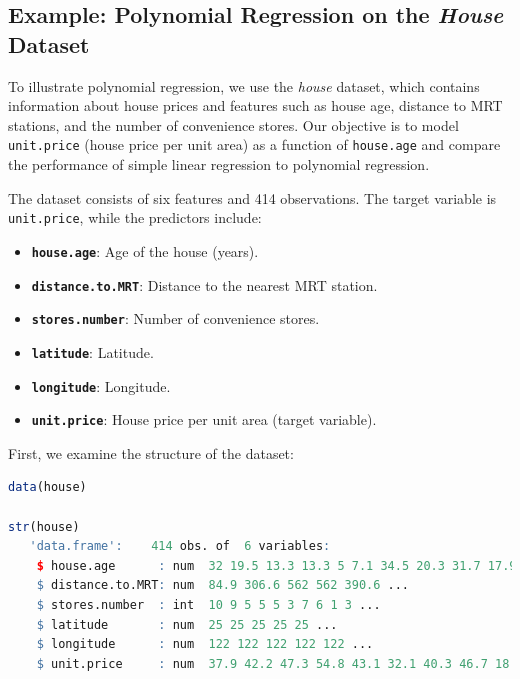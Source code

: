 \documentclass[
]{book}
\newcommand{\passthrough}[1]{#1}
\providecommand{\tightlist}{%
  \setlength{\itemsep}{0pt}\setlength{\parskip}{0pt}}
\theoremstyle{definition}
\theoremstyle{definition}
\theoremstyle{definition}
\theoremstyle{definition}
\theoremstyle{remark}
\begin{document}
\subsection{\texorpdfstring{Example: Polynomial Regression on the \emph{House} Dataset}{Example: Polynomial Regression on the House Dataset}}\label{example-polynomial-regression-on-the-house-dataset}

To illustrate polynomial regression, we use the \emph{house} dataset, which contains information about house prices and features such as house age, distance to MRT stations, and the number of convenience stores. Our objective is to model \passthrough{\lstinline!unit.price!} (house price per unit area) as a function of \passthrough{\lstinline!house.age!} and compare the performance of simple linear regression to polynomial regression.

The dataset consists of six features and 414 observations. The target variable is \passthrough{\lstinline!unit.price!}, while the predictors include:

\begin{itemize}
\tightlist
\item
  \textbf{\passthrough{\lstinline!house.age!}}: Age of the house (years).\\
\item
  \textbf{\passthrough{\lstinline!distance.to.MRT!}}: Distance to the nearest MRT station.\\
\item
  \textbf{\passthrough{\lstinline!stores.number!}}: Number of convenience stores.\\
\item
  \textbf{\passthrough{\lstinline!latitude!}}: Latitude.\\
\item
  \textbf{\passthrough{\lstinline!longitude!}}: Longitude.\\
\item
  \textbf{\passthrough{\lstinline!unit.price!}}: House price per unit area (target variable).
\end{itemize}

First, we examine the structure of the dataset:

\begin{lstlisting}[language=R]
data(house)

str(house)
   'data.frame':    414 obs. of  6 variables:
    $ house.age      : num  32 19.5 13.3 13.3 5 7.1 34.5 20.3 31.7 17.9 ...
    $ distance.to.MRT: num  84.9 306.6 562 562 390.6 ...
    $ stores.number  : int  10 9 5 5 5 3 7 6 1 3 ...
    $ latitude       : num  25 25 25 25 25 ...
    $ longitude      : num  122 122 122 122 122 ...
    $ unit.price     : num  37.9 42.2 47.3 54.8 43.1 32.1 40.3 46.7 18.8 22.1 ...
\end{lstlisting}
\end{document}
